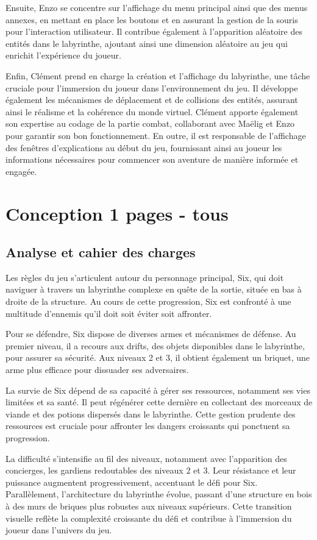 \documentclass[10pt]{article}
\begin{document}
Ensuite, Enzo se concentre sur l'affichage du menu principal ainsi que des menus annexes, en mettant en place les boutons et en assurant la gestion de la souris pour l'interaction utilisateur. Il contribue également à l'apparition aléatoire des entités dans le labyrinthe, ajoutant ainsi une dimension aléatoire au jeu qui enrichit l'expérience du joueur.

Enfin, Clément prend en charge la création et l'affichage du labyrinthe, une tâche cruciale pour l'immersion du joueur dans l'environnement du jeu. Il développe également les mécanismes de déplacement et de collisions des entités, assurant ainsi le réalisme et la cohérence du monde virtuel. Clément apporte également son expertise au codage de la partie combat, collaborant avec Maëlig et Enzo pour garantir son bon fonctionnement. En outre, il est responsable de l'affichage des fenêtres d'explications au début du jeu, fournissant ainsi au joueur les informations nécessaires pour commencer son aventure de manière informée et engagée.

   \clearpage
\section{Conception 1 pages - tous}
\subsection{Analyse et cahier des charges}
Les règles du jeu s'articulent autour du personnage principal, Six, qui doit naviguer à travers un labyrinthe complexe en quête de la sortie, située en bas à droite de la structure. Au cours de cette progression, Six est confronté à une multitude d'ennemis qu'il doit soit éviter soit affronter.

Pour se défendre, Six dispose de diverses armes et mécanismes de défense. Au premier niveau, il a recours aux drifts, des objets disponibles dans le labyrinthe, pour assurer sa sécurité. Aux niveaux 2 et 3, il obtient également un briquet, une arme plus efficace pour dissuader ses adversaires.

La survie de Six dépend de sa capacité à gérer ses ressources, notamment ses vies limitées et sa santé. Il peut régénérer cette dernière en collectant des morceaux de viande et des potions dispersés dans le labyrinthe. Cette gestion prudente des ressources est cruciale pour affronter les dangers croissants qui ponctuent sa progression.

La difficulté s'intensifie au fil des niveaux, notamment avec l'apparition des concierges, les gardiens redoutables des niveaux 2 et 3. Leur résistance et leur puissance augmentent progressivement, accentuant le défi pour Six. Parallèlement, l'architecture du labyrinthe évolue, passant d'une structure en bois à des murs de briques plus robustes aux niveaux supérieurs. Cette transition visuelle reflète la complexité croissante du défi et contribue à l'immersion du joueur dans l'univers du jeu.
\end{document}
